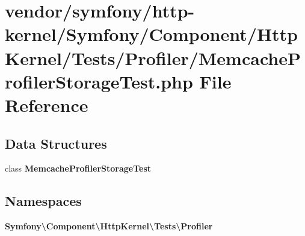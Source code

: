 \section{vendor/symfony/http-\/kernel/\+Symfony/\+Component/\+Http\+Kernel/\+Tests/\+Profiler/\+Memcache\+Profiler\+Storage\+Test.php File Reference}
\label{_memcache_profiler_storage_test_8php}
\subsection*{Data Structures}
\begin{DoxyCompactItemize}
\item 
class {\bf Memcache\+Profiler\+Storage\+Test}
\end{DoxyCompactItemize}
\subsection*{Namespaces}
\begin{DoxyCompactItemize}
\item 
 {\bf Symfony\textbackslash{}\+Component\textbackslash{}\+Http\+Kernel\textbackslash{}\+Tests\textbackslash{}\+Profiler}
\end{DoxyCompactItemize}
